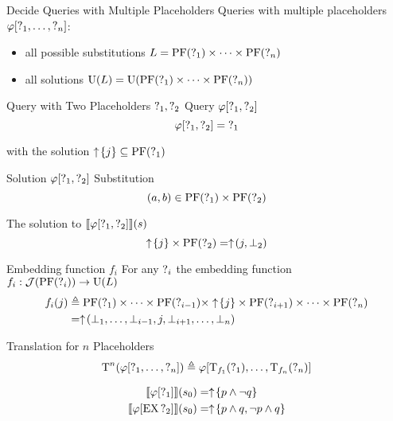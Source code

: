 \begin{frame}{Decide Queries with Multiple Placeholders}
  Queries with multiple placeholders $\phi[\qst_1,\ldots,\qst_n]$:
  \begin{itemize}
    \item all possible substitutions $L = \PF(\qst_1)\times \cdots \times \PF(\qst_n)$
    \item all solutions $\U(L) = \U(\PF(\qst_1) \times \cdots \times \PF(\qst_n))$
  \end{itemize}
\end{frame}

\begin{frame}{Query with Two Placeholders $\qst_1, \qst_2$}
  Query $\phi[\qst_1,\qst_2]$
  \[
    \phi[\qst_1,\qst_2] = \qst_1
  \]

  with the solution $\upclos{j} \subseteq \PF(\qst_1)$
\end{frame}

\begin{frame}{Solution $\phi[\qst_1,\qst_2]$}
  Substitution
  \[
    (a,b) \in \PF(\qst_1)\times \PF(\qst_2)
  \]
  
  The solution to $\llbracket \phi[\qst_1,\qst_2] \rrbracket (s)$
  \[
    \upclos{j} \times \PF(\qst_2) = \uparrow\!(j,\bot_2)
  \]
\end{frame}

\begin{frame}{Embedding function $f_i$}
  For any $\qst_i$ the embedding function $f_i : \mcJ(\PF(\qst_i)) \to \U(L)$
  \begin{align*}
    f_i(j) &\triangleq \PF(\qst_1) \times \cdots \times \PF(\qst_{i-1}) \times
      \upclos{j} \times \PF(\qst_{i+1}) \times \cdots \times \PF(\qst_n) \\
      &= \uparrow\!(\bot_{1},\ldots,\bot_{i-1},j,\bot_{i+1},\ldots,\bot_{n})
  \end{align*}
\end{frame}

\begin{frame}{Translation for $n$ Placeholders}
  \[
    \T^n(\phi[\qst_1,\ldots,\qst_n]) 
    \triangleq \phi[\T_{f_1}(\qst_1),\ldots,\T_{f_n}(\qst_n)]
  \]
  
  \begin{example}
    \begin{align*}
      \llbracket \phi[\qst_1] \rrbracket (s_0) &= \upclos{p \land \lnot q} \\
      \llbracket \phi[\EX\qst_2] \rrbracket (s_0) &= \upclos{p \land q, \lnot p \land q}
    \end{align*}
  \end{example}
\end{frame}

